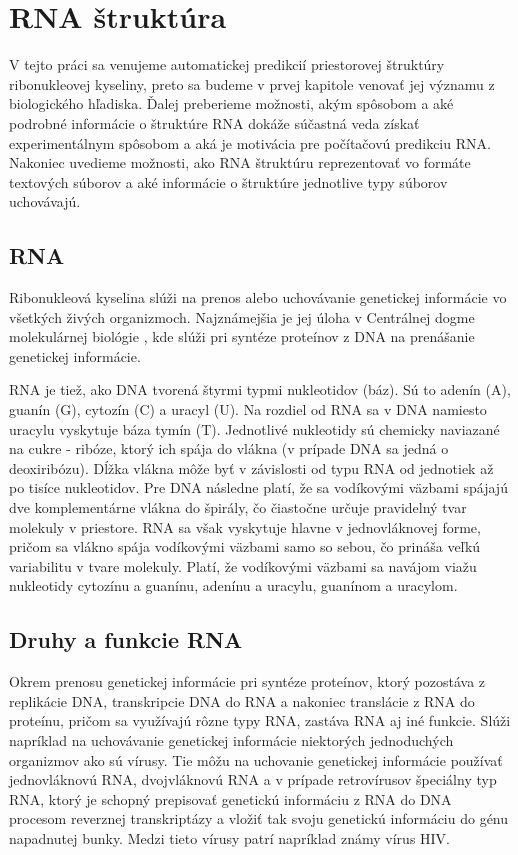 

\chapter{RNA štruktúra}
V tejto práci sa venujeme automatickej predikcií priestorovej štruktúry ribonukleovej kyseliny, 
preto sa budeme v prvej kapitole venovať jej významu z biologického hľadiska. 
Ďalej preberieme možnosti, akým spôsobom a aké podrobné informácie o štruktúre RNA dokáže súčastná veda získať experimentálnym spôsobom a aká je motivácia pre počítačovú predikciu RNA.   
Nakoniec uvedieme možnosti, ako RNA štruktúru reprezentovať vo formáte textových súborov a aké informácie o štruktúre jednotlive typy súborov uchovávajú. 

\section{RNA}
Ribonukleová kyselina slúži na prenos alebo uchovávanie genetickej informácie vo všetkých živých organizmoch. Najznámejšia je jej úloha v Centrálnej dogme molekulárnej biológie \cite{Crick70}, kde slúži pri syntéze proteínov z DNA na prenášanie genetickej informácie.


\indent RNA je tiež, ako DNA tvorená štyrmi typmi nukleotidov (báz). Sú to adenín (A), guanín (G), cytozín (C) a uracyl (U).  Na rozdiel od RNA sa v DNA namiesto uracylu vyskytuje báza tymín (T). Jednotlivé nukleotidy sú chemicky naviazané na cukre - ribóze, ktorý ich spája do vlákna (v prípade DNA sa jedná o deoxiribózu).
Dĺžka vlákna môže byť v závislosti od typu RNA od jednotiek až po tisíce nukleotidov. Pre DNA následne platí, že sa vodíkovými väzbami spájajú dve komplementárne vlákna do špirály, čo čiastočne určuje pravidelný tvar molekuly v priestore. RNA sa však vyskytuje hlavne v  jednovláknovej forme, pričom sa vlákno spája vodíkovými väzbami samo so sebou, čo prináša veľkú variabilitu v tvare molekuly. Platí, že vodíkovými väzbami sa navájom viažu nukleotidy cytozínu a guanínu, adenínu a uracylu, guanínom a uracylom.

\section{Druhy a funkcie RNA}
Okrem prenosu genetickej informácie pri syntéze proteínov, ktorý pozostáva z replikácie DNA, transkripcie DNA do RNA a nakoniec translácie z RNA do proteínu, pričom sa využívajú rôzne typy RNA, zastáva RNA aj iné funkcie. Slúži napríklad na uchovávanie genetickej informácie niektorých jednoduchých organizmov ako sú vírusy. Tie môžu na uchovanie genetickej informácie používať jednovláknovú RNA, dvojvláknovú RNA a v prípade retrovírusov špeciálny typ RNA, ktorý je schopný prepisovať genetickú informáciu z RNA do DNA procesom reverznej transkriptázy a vložiť tak svoju genetickú informáciu do génu napadnutej bunky. Medzi tieto vírusy patrí napríklad známy vírus HIV.  \cite{Krupovice18}


